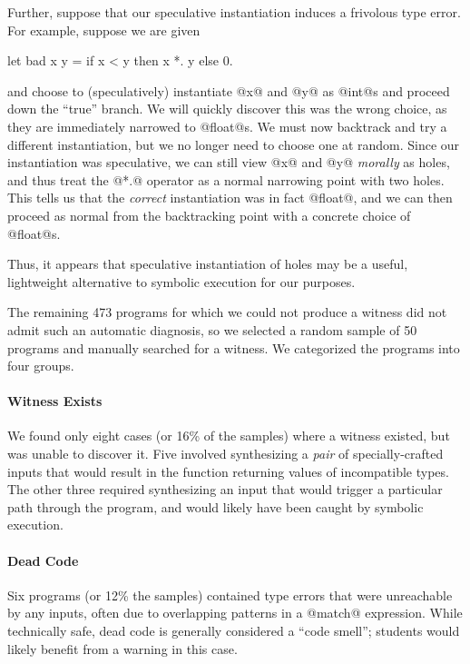 Further, suppose that our speculative instantiation induces a frivolous
type error.
%
For example, suppose we are given
%
\begin{code}
  let bad x y =
    if x < y then
      x *. y
    else
      0.
\end{code}
%
and choose to (speculatively) instantiate @x@ and @y@ as @int@s and proceed
down the ``true'' branch.
%
We will quickly discover this was the wrong choice, as they are immediately
narrowed to @float@s.
%
We must now backtrack and try a different instantiation, but we no
longer need to choose one at random.
%
Since our instantiation was speculative, we can still view @x@ and @y@
\emph{morally} as holes, and thus treat the @*.@ operator as a normal
narrowing point with two holes.
%
This tells us that the \emph{correct} instantiation was in fact @float@,
and we can then proceed as normal from the backtracking point with a
concrete choice of @float@s.

Thus, it appears that speculative instantiation of holes may be a
useful, lightweight alternative to symbolic execution for our purposes.

The remaining 473 programs for which we could not produce a witness did
not admit such an automatic diagnosis, so we selected a random sample of
50 programs and manually searched for a witness.
%
We categorized the programs into four groups.

\paragraph{Witness Exists}
%
We found only eight cases (or 16\% of the samples) where a witness existed,
but \toolname was unable to discover it.
%
Five involved synthesizing a \emph{pair} of specially-crafted inputs
that would result in the function returning values of incompatible
types.
%
The other three required synthesizing an input that would trigger a
particular path through the program, and would likely have been caught
by symbolic execution.
%
%

\paragraph{Dead Code}
%
Six programs (or 12\% the samples) contained type errors that were
unreachable by any inputs, often due to overlapping patterns in a
@match@ expression.
%
While technically safe, dead code is generally considered a ``code
smell''; students would likely benefit from a warning in this case.

